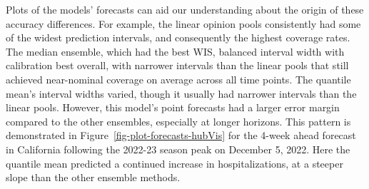 \documentclass[
  article,
  shortnames,
  notitle]{jss}
\begin{document}
Plots of the models' forecasts can aid our understanding about the
origin of these accuracy differences. For example, the linear opinion
pools consistently had some of the widest prediction intervals, and
consequently the highest coverage rates. The median ensemble, which had
the best WIS, balanced interval width with calibration best overall,
with narrower intervals than the linear pools that still achieved
near-nominal coverage on average across all time points. The quantile
mean's interval widths varied, though it usually had narrower intervals
than the linear pools. However, this model's point forecasts had a
larger error margin compared to the other ensembles, especially at
longer horizons. This pattern is demonstrated in
Figure~\ref{fig-plot-forecasts-hubVis} for the 4-week ahead forecast in
California following the 2022-23 season peak on December 5, 2022. Here
the quantile mean predicted a continued increase in hospitalizations, at
a steeper slope than the other ensemble methods.
\end{document}
